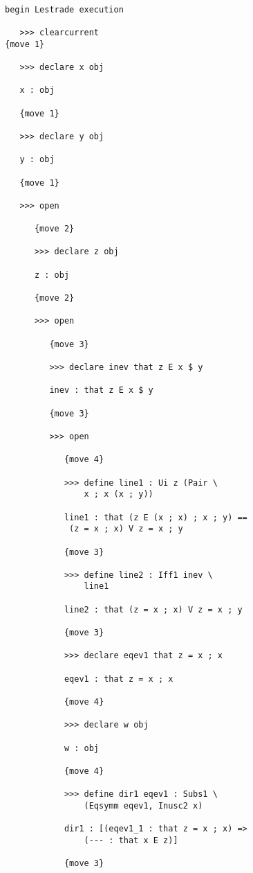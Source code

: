 \documentclass[12pt]{article}
\begin{document}
\begin{verbatim}

begin Lestrade execution

   >>> clearcurrent
{move 1}

   >>> declare x obj

   x : obj

   {move 1}

   >>> declare y obj

   y : obj

   {move 1}

   >>> open

      {move 2}

      >>> declare z obj

      z : obj

      {move 2}

      >>> open

         {move 3}

         >>> declare inev that z E x $ y

         inev : that z E x $ y

         {move 3}

         >>> open

            {move 4}

            >>> define line1 : Ui z (Pair \
                x ; x (x ; y))

            line1 : that (z E (x ; x) ; x ; y) == 
             (z = x ; x) V z = x ; y

            {move 3}

            >>> define line2 : Iff1 inev \
                line1

            line2 : that (z = x ; x) V z = x ; y

            {move 3}

            >>> declare eqev1 that z = x ; x

            eqev1 : that z = x ; x

            {move 4}

            >>> declare w obj

            w : obj

            {move 4}

            >>> define dir1 eqev1 : Subs1 \
                (Eqsymm eqev1, Inusc2 x)

            dir1 : [(eqev1_1 : that z = x ; x) => 
                (--- : that x E z)]

            {move 3}


\end{verbatim}
\end{document}
